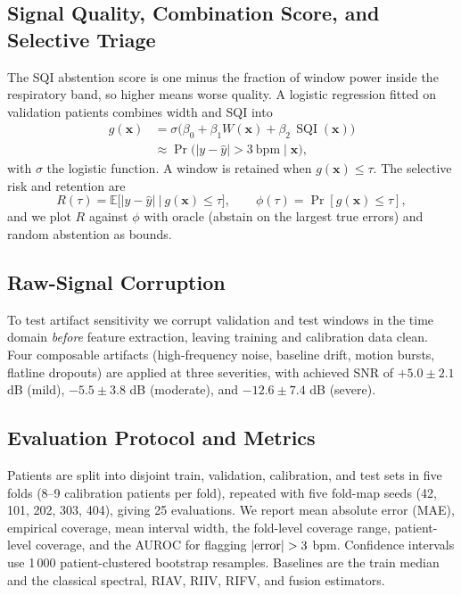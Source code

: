 \documentclass[conference]{IEEEtran}
\DeclareMathOperator{\SQI}{SQI}
\begin{document}
\subsection{Signal Quality, Combination Score, and Selective Triage}
The SQI abstention score is one minus the fraction of window power inside the respiratory band, so higher means worse quality. A logistic regression fitted on validation patients combines width and SQI into
\begin{equation}
\begin{split}
g(\mathbf{x})&=\sigma\big(\beta_0+\beta_1 W(\mathbf{x})+\beta_2\,\SQI(\mathbf{x})\big)\\
&\approx\Pr\big(|y-\hat{y}|>3\ \text{bpm}\mid\mathbf{x}\big),
\end{split}\label{eq:combo}
\end{equation}
with $\sigma$ the logistic function. A window is retained when $g(\mathbf{x})\le\tau$. The selective risk and retention are
\begin{equation}
R(\tau)=\mathbb{E}\big[|y-\hat{y}|\ \big|\ g(\mathbf{x})\le\tau\big],\qquad \phi(\tau)=\Pr[g(\mathbf{x})\le\tau],\label{eq:risk}
\end{equation}
and we plot $R$ against $\phi$ with oracle (abstain on the largest true errors) and random abstention as bounds.

\subsection{Raw-Signal Corruption}
To test artifact sensitivity we corrupt validation and test windows in the time domain \emph{before} feature extraction, leaving training and calibration data clean. Four composable artifacts (high-frequency noise, baseline drift, motion bursts, flatline dropouts) are applied at three severities, with achieved SNR of $+5.0\pm2.1$ dB (mild), $-5.5\pm3.8$ dB (moderate), and $-12.6\pm7.4$ dB (severe).

\subsection{Evaluation Protocol and Metrics}
Patients are split into disjoint train, validation, calibration, and test sets in five folds (8--9 calibration patients per fold), repeated with five fold-map seeds (42, 101, 202, 303, 404), giving 25 evaluations. We report mean absolute error (MAE), empirical coverage, mean interval width, the fold-level coverage range, patient-level coverage, and the AUROC for flagging $|{\rm error}|>3$ bpm. Confidence intervals use 1\,000 patient-clustered bootstrap resamples. Baselines are the train median and the classical spectral, RIAV, RIIV, RIFV, and fusion estimators.
\end{document}

